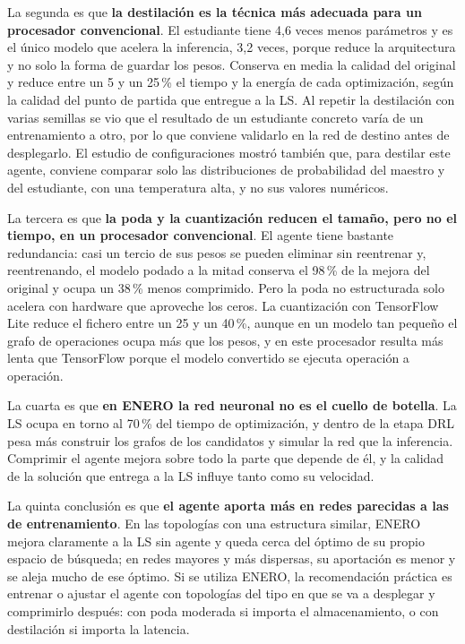 La segunda es que \textbf{la destilación es la técnica más adecuada para un procesador convencional}. El estudiante tiene 4,6 veces menos parámetros y es el único modelo que acelera la inferencia, 3,2 veces, porque reduce la arquitectura y no solo la forma de guardar los pesos. Conserva en media la calidad del original y reduce entre un 5 y un 25\,\% el tiempo y la energía de cada optimización, según la calidad del punto de partida que entregue a la LS. Al repetir la destilación con varias semillas se vio que el resultado de un estudiante concreto varía de un entrenamiento a otro, por lo que conviene validarlo en la red de destino antes de desplegarlo. El estudio de configuraciones mostró también que, para destilar este agente, conviene comparar solo las distribuciones de probabilidad del maestro y del estudiante, con una temperatura alta, y no sus valores numéricos.

La tercera es que \textbf{la poda y la cuantización reducen el tamaño, pero no el tiempo, en un procesador convencional}. El agente tiene bastante redundancia: casi un tercio de sus pesos se pueden eliminar sin reentrenar y, reentrenando, el modelo podado a la mitad conserva el 98\,\% de la mejora del original y ocupa un 38\,\% menos comprimido. Pero la poda no estructurada solo acelera con hardware que aproveche los ceros. La cuantización con TensorFlow Lite reduce el fichero entre un 25 y un 40\,\%, aunque en un modelo tan pequeño el grafo de operaciones ocupa más que los pesos, y en este procesador resulta más lenta que TensorFlow porque el modelo convertido se ejecuta operación a operación.

La cuarta es que \textbf{en ENERO la red neuronal no es el cuello de botella}. La LS ocupa en torno al 70\,\% del tiempo de optimización, y dentro de la etapa DRL pesa más construir los grafos de los candidatos y simular la red que la inferencia. Comprimir el agente mejora sobre todo la parte que depende de él, y la calidad de la solución que entrega a la LS influye tanto como su velocidad.

La quinta conclusión es que \textbf{el agente aporta más en redes parecidas a las de entrenamiento}. En las topologías con una estructura similar, ENERO mejora claramente a la LS sin agente y queda cerca del óptimo de su propio espacio de búsqueda; en redes mayores y más dispersas, su aportación es menor y se aleja mucho de ese óptimo. Si se utiliza ENERO, la recomendación práctica es entrenar o ajustar el agente con topologías del tipo en que se va a desplegar y comprimirlo después: con poda moderada si importa el almacenamiento, o con destilación si importa la latencia.

